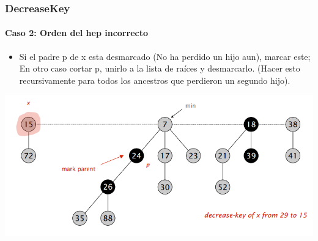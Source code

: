 \documentclass{beamer}
\begin{document}
\begin{frame}
  \frametitle{DecreaseKey}
  \framesubtitle{Caso 2: Orden del hep incorrecto}
  \begin{itemize}
    \item Si el padre p de x esta desmarcado (No ha perdido un hijo aun), marcar este; En otro caso cortar p, unirlo a la lista de raíces y desmarcarlo. (Hacer esto recursivamente para todos los ancestros que perdieron un segundo hijo).
  \end{itemize}
     \includegraphics[width =1 \textwidth]{img/decrease/04.png}
\end{frame}
\end{document}
